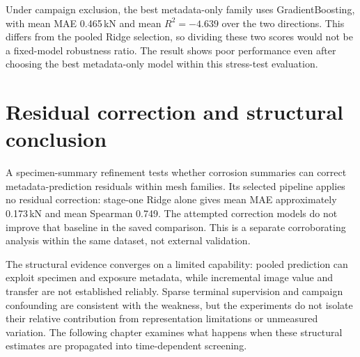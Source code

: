 Under campaign exclusion, the best metadata-only family uses GradientBoosting, with mean MAE 0.465\,kN and mean $R^2=-4.639$ over the two directions. This differs from the pooled Ridge selection, so dividing these two scores would not be a fixed-model robustness ratio. The result shows poor performance even after choosing the best metadata-only model within this stress-test evaluation.

\section{Residual correction and structural conclusion}
A specimen-summary refinement tests whether corrosion summaries can correct metadata-prediction residuals within mesh families. Its selected pipeline applies no residual correction: stage-one Ridge alone gives mean MAE approximately 0.173\,kN and mean Spearman 0.749. The attempted correction models do not improve that baseline in the saved comparison. This is a separate corroborating analysis within the same dataset, not external validation.

The structural evidence converges on a limited capability: pooled prediction can exploit specimen and exposure metadata, while incremental image value and transfer are not established reliably. Sparse terminal supervision and campaign confounding are consistent with the weakness, but the experiments do not isolate their relative contribution from representation limitations or unmeasured variation. The following chapter examines what happens when these structural estimates are propagated into time-dependent screening.
